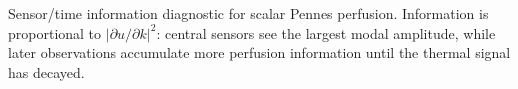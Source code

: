 \caption{Sensor/time information diagnostic for scalar Pennes perfusion. Information is proportional to $|\partial u/\partial k|^2$: central sensors see the largest modal amplitude, while later observations accumulate more perfusion information until the thermal signal has decayed.}\label{fig:sensor-time-information}
